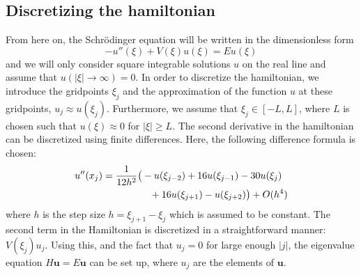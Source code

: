 \documentclass[twocolumn]{article}
\begin{document}
\begin{large}
\subsection*{Discretizing the hamiltonian}
From here on, the Schrödinger equation will be written in the dimensionless form
\begin{equation}
    -u''(\xi) + V(\xi)u(\xi) = Eu(\xi)
\end{equation}
and we will only consider square integrable solutions $u$ on the real line and assume that $u(|\xi|\to\infty) = 0$. In order to discretize the hamiltonian, we introduce the gridpoints $\xi_j$ and the approximation of the function $u$ at these gridpoints, $u_j\approx u(\xi_j)$. Furthermore, we assume that $\xi_j\in[-L,L]$, where $L$ is chosen such that $u(\xi)\approx 0$ for $|\xi|\geq L$. The second derivative in the hamiltonian can be discretized using finite differences. Here, the following difference formula is chosen:
\begin{equation}
    \begin{split}
        u''(x_j) &= \frac{1}{12h^2}\big(-u(\xi_{j-2})+16u(\xi_{j-1})-30u(\xi_j) \\ 
        &\hspace{1.7cm}+16u(\xi_{j+1})-u(\xi_{j+2})\big) + O(h^4)
    \end{split}
\end{equation}
where $h$ is the step size $h = \xi_{j+1} - \xi_j$ which is assumed to be constant. The second term in the Hamiltonian is discretized in a straightforward manner: $V(\xi_j)u_j$. Using this, and the fact that $u_j=0$ for large enough $|j|$, the eigenvalue equation $H\mathbf{u} = E\mathbf{u}$ can be set up, where $u_j$ are the elements of $\mathbf{u}$. 


\end{large}
\end{document}
